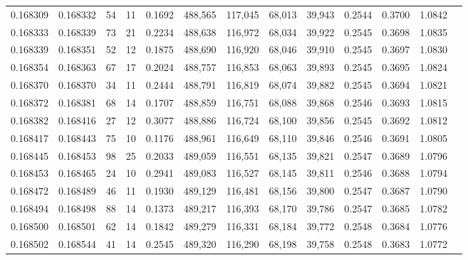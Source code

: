 \begin{tabular}{rrrrrrrrrrrrr}
0.168309 & 0.168332 &    54 &  11 &                                     0.1692 & 488,565 & 117,045 &  68,013 &  39,943 & 0.2544 & 0.3700 & 1.0842 \\
0.168333 & 0.168339 &    73 &  21 &                                     0.2234 & 488,638 & 116,972 &  68,034 &  39,922 & 0.2545 & 0.3698 & 1.0835 \\
0.168339 & 0.168351 &    52 &  12 &                                     0.1875 & 488,690 & 116,920 &  68,046 &  39,910 & 0.2545 & 0.3697 & 1.0830 \\
0.168354 & 0.168363 &    67 &  17 &                                     0.2024 & 488,757 & 116,853 &  68,063 &  39,893 & 0.2545 & 0.3695 & 1.0824 \\
0.168370 & 0.168370 &    34 &  11 &                                     0.2444 & 488,791 & 116,819 &  68,074 &  39,882 & 0.2545 & 0.3694 & 1.0821 \\
0.168372 & 0.168381 &    68 &  14 &                                     0.1707 & 488,859 & 116,751 &  68,088 &  39,868 & 0.2546 & 0.3693 & 1.0815 \\
0.168382 & 0.168416 &    27 &  12 &                                     0.3077 & 488,886 & 116,724 &  68,100 &  39,856 & 0.2545 & 0.3692 & 1.0812 \\
0.168417 & 0.168443 &    75 &  10 &                                     0.1176 & 488,961 & 116,649 &  68,110 &  39,846 & 0.2546 & 0.3691 & 1.0805 \\
0.168445 & 0.168453 &    98 &  25 &                                     0.2033 & 489,059 & 116,551 &  68,135 &  39,821 & 0.2547 & 0.3689 & 1.0796 \\
0.168453 & 0.168465 &    24 &  10 &                                     0.2941 & 489,083 & 116,527 &  68,145 &  39,811 & 0.2546 & 0.3688 & 1.0794 \\
0.168472 & 0.168489 &    46 &  11 &                                     0.1930 & 489,129 & 116,481 &  68,156 &  39,800 & 0.2547 & 0.3687 & 1.0790 \\
0.168494 & 0.168498 &    88 &  14 &                                     0.1373 & 489,217 & 116,393 &  68,170 &  39,786 & 0.2547 & 0.3685 & 1.0782 \\
0.168500 & 0.168501 &    62 &  14 &                                     0.1842 & 489,279 & 116,331 &  68,184 &  39,772 & 0.2548 & 0.3684 & 1.0776 \\
0.168502 & 0.168544 &    41 &  14 &                                     0.2545 & 489,320 & 116,290 &  68,198 &  39,758 & 0.2548 & 0.3683 & 1.0772 \\

\end{tabular}
